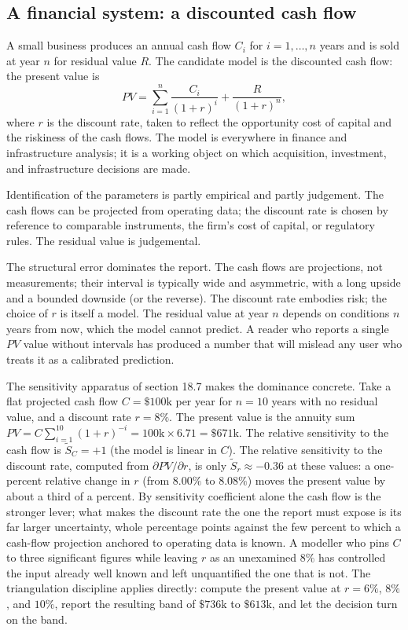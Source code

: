 \subsection{A financial system: a discounted cash flow}

A small business produces an annual cash flow $C_{i}$ for
$i = 1, \ldots, n$ years and is sold at year $n$ for residual
value $R$. The candidate model is the discounted cash flow:
the present value is
\[
PV = \sum_{i=1}^{n} \frac{C_{i}}{(1 + r)^{i}}
   + \frac{R}{(1 + r)^{n}},
\]
where $r$ is the discount rate, taken to reflect the
opportunity cost of capital and the riskiness of the cash
flows. The model is everywhere in finance and infrastructure
analysis; it is a working object on which acquisition,
investment, and infrastructure decisions are made.

Identification of the parameters is partly empirical and
partly judgement. The cash flows can be projected from
operating data; the discount rate is chosen by reference to
comparable instruments, the firm's cost of capital, or
regulatory rules. The residual value is judgemental.

The structural error dominates the report. The cash flows
are projections, not measurements; their interval is
typically wide and asymmetric, with a long upside and a
bounded downside (or the reverse). The discount rate
embodies risk; the choice of $r$ is itself a model. The
residual value at year $n$ depends on conditions $n$ years
from now, which the model cannot predict. A reader who
reports a single $PV$ value without intervals has produced a
number that will mislead any user who treats it as a
calibrated prediction.

The sensitivity apparatus of section 18.7 makes the dominance concrete.
Take a flat projected cash flow $C = \$100\text{k}$ per year for
$n = 10$ years with no residual value, and a discount rate $r = 8\%$. The
present value is the annuity sum $PV = C \sum_{i=1}^{10}(1+r)^{-i} =
100\text{k} \times 6.71 = \$671\text{k}$. The relative sensitivity to
the cash flow is $\tilde S_C = +1$ (the model is linear in $C$). The
relative sensitivity to the discount rate, computed from
$\partial PV/\partial r$, is only $\tilde S_r \approx -0.36$ at these
values: a one-percent relative change in $r$ (from $8.00\%$ to
$8.08\%$) moves the present value by about a third of a percent. By
sensitivity coefficient alone the cash flow is the stronger lever; what
makes the discount rate the one the report must expose is its far
larger uncertainty, whole percentage points against the few percent to
which a cash-flow projection anchored to operating data is known. A
modeller who pins $C$ to three significant figures while leaving $r$ as
an unexamined $8\%$ has controlled the input already well known and left
unquantified the one that is not. The
triangulation discipline applies directly: compute the present value at
$r = 6\%$, $8\%$, and $10\%$, report the resulting band of
$\$736\text{k}$ to $\$613\text{k}$, and let the decision turn on the
band.

